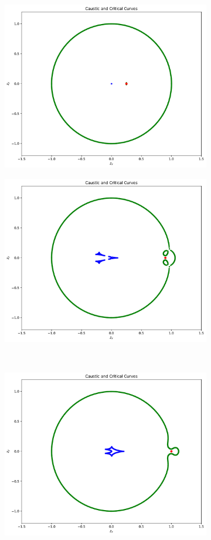 \documentclass{article}
\begin{document}
\begin{figure}[h]
\centering
\begin{subfigure}{.5\textwidth}
  \begin{minipage}{0.1\textwidth}
    \caption{} \label{fig:Caustic_x=0_25}
  \end{minipage}\hfill
\begin{minipage}[c]{0.85\textwidth}
    \includegraphics[width=7 cm]{Critical_and_Caustic_Curves_x_0_25.pdf}
  \end{minipage}\hfill
\end{subfigure}%
\begin{subfigure}{.5\textwidth}
  \begin{minipage}{0.1\textwidth}
    \caption{} \label{fig:Caustic_x=0_9}
  \end{minipage}\hfill
\begin{minipage}[c]{0.85\textwidth}
    \includegraphics[width=7 cm]{Critical_and_Caustic_Curves_x_0_9.pdf}
  \end{minipage}\hfill
\end{subfigure} \\
\begin{subfigure}{.5\textwidth}
  \begin{minipage}{0.1\textwidth}
    \caption{} \label{fig:Caustic_x=1}
  \end{minipage}\hfill
\begin{minipage}[c]{0.85\textwidth}
    \includegraphics[width=7 cm]{Critical_and_Caustic_Curves_x_1.pdf}

\end{minipage}
\end{subfigure}
\end{figure}
\end{document}
